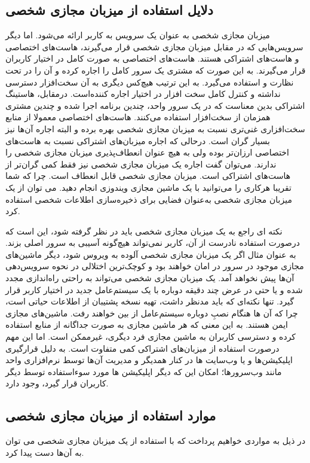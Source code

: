 {\subsection{دلایل استفاده از میزبان مجازی شخصی}
میزبان مجازی شخصی به عنوان یک سرویس به کاربر ارائه می‌شود. اما دیگر سرویس‌هایی که در مقابل میزبان مجازی شخصی قرار می‌گیرند، هاست‌های اختصاصی و هاست‌های اشتراکی هستند.
هاست‌های اختصاصی به صورت کامل در اختیار کاربران قرار می‌گیرند. به این صورت که مشتری یک سرور کامل را اجاره کرده و آن را در تحت نظارت و استفاده می‌گیرد. به این ترتیب هیچ‌کس دیگری به آن سخت‌افزار دسترسی نداشته و کنترل کامل سخت افزار در اختیار اجاره کننده‌است.
درمقابل، هاستینگ اشتراکی بدین معناست که در یک سرور واحد، چندین برنامه اجرا شده و چندین مشتری همزمان از سخت‌افزار استفاده می‌کنند.
هاست‌های اختصاصی معمولا از منابع سخت‌افزاری غنی‌تری نسبت به میزبان مجازی شخصی بهره برده و البته اجاره آن‌ها نیز بسیار گران است. درحالی که اجاره میزبان‌های اشتراکی نسبت به هاست‌های اختصاصی ارزان‌تر بوده ولی به هیچ عنوان انعطاف‌پذیری میزبان مجازی شخصی را ندارند.
می‌توان گفت اجاره یک میزبان مجازی شخصی نیز فقط کمی گران‌تر از هاست‌های اشتراکی است. 
میزبان مجازی شخصی قابل انعطاف است. چرا که شما تقریبا هرکاری را می‌توانید با یک ماشین مجازی ویندوزی انجام دهید. می توان از یک میزبان مجازی شخصی به‌عنوان فضایی برای ذخیره‌سازی اطلاعات شخصی استفاده کرد.

نکته ای راجع به یک میزبان مجازی شخصی باید در نظر گرفته شود، این است که درصورت استفاده نادرست از آن، کاربر نمی‌تواند هیچ‌گونه آسیبی به سرور اصلی بزند. به عنوان مثال اگر یک میزبان مجازی شخصی آلوده به ویروس شود، دیگر ماشین‌های مجازی موجود در سرور در امان خواهند بود و کوچک‌ترین اختلالی در نحوه سرویس‌دهی آن‌ها پیش نخواهد آمد.
یک میزبان مجازی شخصی می‌تواند به راحتی راه‌اندازی مجدد شده و یا حتی در عرض چند دقیقه دوباره با یک سیستم‌عامل جدید در اختیار کاربر قرار گیرد. تنها نکته‌ای که باید مدنظر داشت، تهیه نسخه پشتیبان از اطلاعات حیاتی است، چرا که آن ها هنگام نصبِ دوباره سیستم‌عامل از بین خواهند رفت.
ماشین‌های مجازی ایمن هستند. به این معنی که هر ماشین مجازی به صورت جداگانه از منابع استفاده کرده و دسترسی کاربران به ماشین مجازی فرد دیگری، غیرممکن است.
اما این مهم درصورت استفاده از میزبان‌های اشتراکی کمی متفاوت است. به دلیل قرارگیری اپلیکیشن‌ها و یا وب‌سایت ها در کنار همدیگر و مدیریت آن‌ها توسط نرم‌افزاری واحد مانند وب‌سرورها؛ امکان این که دیگر اپلیکیشن ها مورد سوءاستفاده توسط دیگر کاربران قرار گیرد، وجود دارد.
 

\subsection{موارد استفاده از میزبان مجازی شخصی}
در ذیل به مواردی خواهیم پرداخت که با استفاده از یک میزبان مجازی شخصی می توان به آن‌ها دست پیدا کرد.

}

